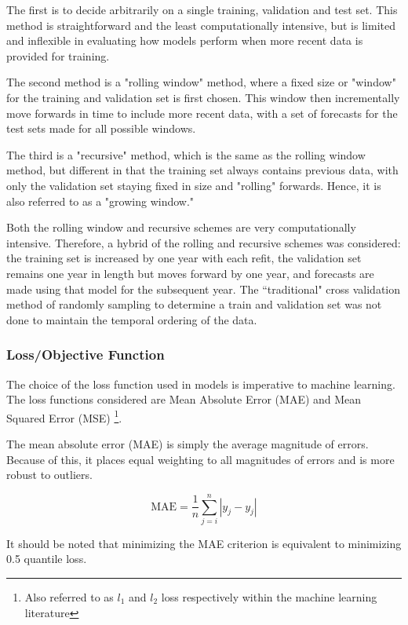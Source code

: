 \documentclass[11pt, a4paper, table]{article}
\begin{document}
The first is to decide arbitrarily on a single training, validation and test set. This method is straightforward and the least computationally intensive, but is limited and inflexible in evaluating how models perform when more recent data is provided for training. 

The second method is a "rolling window" method, where a fixed size or "window" for the training and validation set is first chosen. This window then incrementally move forwards in time to include more recent data, with a set of forecasts for the test sets made for all possible windows.

The third is a "recursive" method, which is the same as the rolling window method, but different in that the training set always contains previous data, with only the validation set staying fixed in size and "rolling" forwards. Hence, it is also referred to as a "growing window."

Both the rolling window and recursive schemes are very computationally intensive. Therefore, a hybrid of the rolling and recursive schemes was considered: the training set is increased by one year with each refit, the validation set remains one year in length but moves forward by one year, and forecasts are made using that model for the subsequent year. The ``traditional" cross validation method of randomly sampling to determine a train and validation set was not done to maintain the temporal ordering of the data.

\subsubsection{Loss/Objective Function}
\label{loss_function}
The choice of the loss function used in models is imperative to machine learning. The loss functions considered are Mean Absolute Error (MAE) and Mean Squared Error (MSE) \footnote{Also referred to as $l_1$ and $l_2$ loss respectively within the machine learning literature}.

The mean absolute error (MAE) is simply the average magnitude of errors. Because of this, it places equal weighting to all magnitudes of errors and is more robust to outliers. 

\begin{equation}
	\text{MAE} = \frac{1}{n} \sum_{j = i}^{n} |y_j - \hat{y_j}|
\end{equation}

It should be noted that minimizing the MAE criterion is equivalent to minimizing 0.5 quantile loss.
\end{document}
